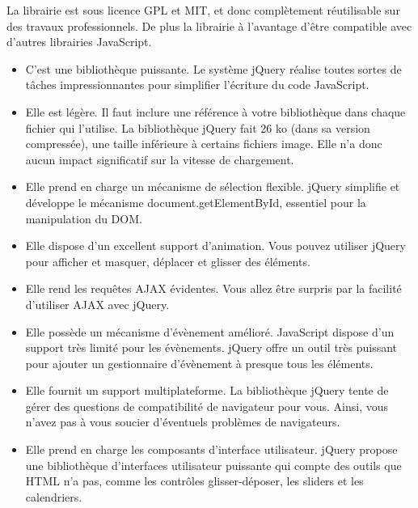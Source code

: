 La librairie est sous licence GPL et MIT, et donc complètement réutilisable sur des travaux professionnels. De plus la librairie à l’avantage d’être compatible avec d’autres librairies JavaScript.

\begin{itemize}
  \item[\textbullet]
  C'est une bibliothèque puissante. Le système jQuery réalise toutes sortes de tâches impressionnantes pour simplifier l'écriture du code JavaScript.
  
  \item[\textbullet]
  Elle est légère. Il faut inclure une référence à votre bibliothèque dans chaque fichier qui l'utilise. La bibliothèque jQuery fait 26 ko (dans sa version compressée), une taille inférieure à certains fichiers image. Elle n'a donc aucun impact significatif sur la vitesse de chargement.
  
  \item[\textbullet]
  Elle prend en charge un mécanisme de sélection flexible. jQuery simplifie et développe le mécanisme document.getElementById, essentiel pour la manipulation du DOM.
  
    \item[\textbullet]
    Elle dispose d'un excellent support d'animation. Vous pouvez utiliser jQuery pour afficher et masquer, déplacer et glisser des éléments.
    
    \item[\textbullet]
    Elle rend les requêtes AJAX évidentes. Vous allez être surpris par la facilité d'utiliser AJAX avec jQuery.
      
    \item[\textbullet]
    Elle possède un mécanisme d'évènement amélioré. JavaScript dispose d'un support très limité pour les évènements. jQuery offre un outil très puissant pour ajouter un gestionnaire d'évènement à presque tous les éléments.
    
    \item[\textbullet]
    Elle fournit un support multiplateforme. La bibliothèque jQuery tente de gérer des questions de compatibilité de navigateur pour vous. Ainsi, vous n'avez pas à vous soucier d'éventuels problèmes de navigateurs.
    
    \item[\textbullet]
    Elle prend en charge les composants d'interface utilisateur. jQuery propose une bibliothèque d'interfaces utilisateur puissante qui compte des outils que HTML n'a pas, comme les contrôles glisser-déposer, les sliders et les calendriers.


\end{itemize}
